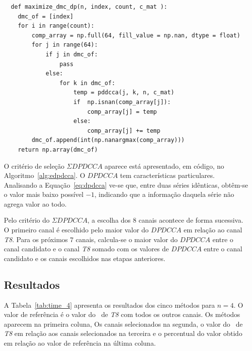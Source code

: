 \begin{algorithm} \caption{$\Sigma DPDCCA$} \label{alg:edpdcca}
  \begin{lstlisting}
  def maximize_dmc_dp(n, index, count, c_mat ):
    dmc_of = [index]
    for i in range(count):
        comp_array = np.full(64, fill_value = np.nan, dtype = float)
        for j in range(64):
            if j in dmc_of:
                pass
            else:
                for k in dmc_of:
                    temp = pddcca(j, k, n, c_mat)
                    if  np.isnan(comp_array[j]):
                        comp_array[j] = temp
                    else:
                        comp_array[j] += temp
        dmc_of.append(int(np.nanargmax(comp_array)))
    return np.array(dmc_of)

    \end{lstlisting}
\end{algorithm}

O critério de seleção $\Sigma DPDCCA$ aparece está apresentado, em código, no Algoritmo~\ref{alg:edpdcca}. O $DPDCCA$ tem características particulares. Analisando a Equação~\ref{eq:dpdcca} ve-se que, entre duas séries idênticas, obtêm-se o valor mais baixo possível $-1$, indicando que a informação daquela série não agrega valor ao todo.

Pelo critério do $\Sigma DPDCCA$, a escolha dos 8 canais acontece de forma sucessiva. O primeiro canal é escolhido pelo maior valor do $DPDCCA$ em relação ao canal \emph{T8}. Para os próximos $7$ canais, calcula-se o maior valor do $DPDCCA$ entre o canal candidato e o canal \emph{T8} somado com os valores de $DPDCCA$ entre o canal candidato e os canais escolhidos nas etapas anteriores.


\subsection{Resultados}

A Tabela~\ref{tab:time_4} apresenta os resultados dos cinco métodos para $n=4$. O valor de referência é o valor do \dmc~de \emph{T8} com todos os outros canais. Os métodos aparecem na primeira coluna, Os canais selecionados na segunda, o valor do \dmc~de \emph{T8} em relação aos canais selecionados na terceira e o percentual do valor obtido em relação ao valor de referência na última coluna.

